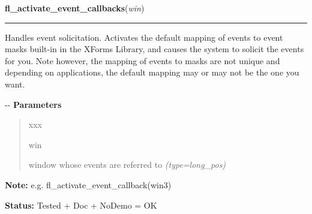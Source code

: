 \hspace{.8\funcindent}\begin{boxedminipage}{\funcwidth}

    \raggedright \textbf{fl\_activate\_event\_callbacks}(\textit{win})

    \vspace{-1.5ex}

    \rule{\textwidth}{0.5\fboxrule}
\setlength{\parskip}{2ex}

Handles event solicitation. Activates the default mapping of events
to event masks built-in in the XForms Library, and causes the system
to solicit the events for you. Note however, the mapping of events to
masks are not unique and depending on applications, the default mapping
may or may not be the one you want.

-{}-
\setlength{\parskip}{1ex}
      \textbf{Parameters}
      \vspace{-1ex}

      \begin{quote}
        \begin{Ventry}{xxx}

          \item[win]


window whose events are referred to
            {\it (type=long\_pos)}

        \end{Ventry}

      \end{quote}

\textbf{Note:} 
e.g. fl\_activate\_event\_callback(win3)


\textbf{Status:} 
Tested + Doc + NoDemo = OK


    \end{boxedminipage}

    \label{xformslib:flxbasic:fl_print_xevent_name}

    \vspace{0.5ex}

